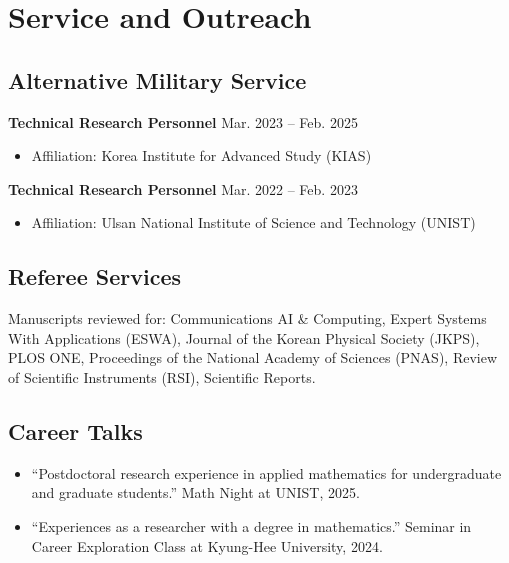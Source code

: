 \documentclass[11pt,a4paper]{article}
\newcommand{\cvitem}[2]{
    \noindent\textbf{#1} \hfill #2
}
\begin{document}
\section*{Service and Outreach}

\subsection*{Alternative Military Service}

\cvitem{Technical Research Personnel}{Mar. 2023 -- Feb. 2025}
\begin{itemize}[leftmargin=1.5em, topsep=0.2em, itemsep=0.1em]
    \item Affiliation: Korea Institute for Advanced Study (KIAS)
\end{itemize}

\vspace{0.2em}

\cvitem{Technical Research Personnel}{Mar. 2022 -- Feb. 2023}
\begin{itemize}[leftmargin=1.5em, topsep=0.2em, itemsep=0.1em]
    \item Affiliation: Ulsan National Institute of Science and Technology (UNIST)
\end{itemize}

\subsection*{Referee Services}

Manuscripts reviewed for: Communications AI \& Computing, Expert Systems With Applications (ESWA), Journal of the Korean Physical Society (JKPS), PLOS ONE, Proceedings of the National Academy of Sciences (PNAS), Review of Scientific Instruments (RSI), Scientific Reports.

\subsection*{Career Talks}

\begin{itemize}[leftmargin=1.5em, topsep=0.2em, itemsep=0.2em]
    \item ``Postdoctoral research experience in applied mathematics for undergraduate and graduate students.'' Math Night at UNIST, 2025.
    
    \item ``Experiences as a researcher with a degree in mathematics.'' Seminar in Career Exploration Class at Kyung-Hee University, 2024.
\end{itemize}
\end{document}
